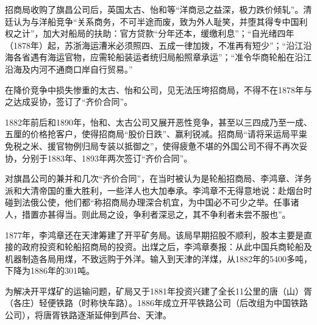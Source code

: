 \documentclass[10pt,a4paper]{beamer} %
\begin{document}
	\begin{frame}
		招商局收购了旗昌公司后，英国太古、怡和等“洋商忌之益深，极力跌价倾轧”。清廷认为与洋船竞争“关系商务，不可半途而废，致为外人耻笑，并堕其得专中国利权之计”，加大对船局的扶助：官方贷款“分年还本，缓缴利息”；“自光绪四年（1878年）起，苏浙海运漕米必须照四、五成一律加拨，不准再有短少”；“沿江沿海各省遇有海运官物，应需轮船装运者统归局船照章承运”；“准令华商轮船在沿江沿海及内河不通商口岸自行贸易。”
		
		在降价竞争中损失惨重的太古、怡和公司，见无法压垮招商局，不得不在1878年与之达成妥协，签订了“齐价合同”。
		
		1882年前后和1890年，怡和、太古公司又展开恶性竞争，甚至以三四成乃至一成、五厘的价格抢客户，使得招商局“股价日跌”、赢利锐减。招商局“请将采运局平粜免税之米、援官物例归局专装以抵御之”，使得疲惫不堪的外国公司不得不再次妥协，分别于1883年、1893年两次签订“齐价合同”。
		
		对旗昌公司的兼并和几次“齐价合同”，在当时被认为是轮船招商局、李鸿章、洋务派和大清帝国的重大胜利，一些洋人也大加奉承。李鸿章不无得意地说：赴烟台时碰到法俄公使，他们都“称招商局办理深合机宜，为中国必不可少之举。任事诸人，措置亦甚得当。则此局之设，争利者深忌之，其不争利者未尝不服也”。
		
		1877年，李鸿章还在天津筹建了开平矿务局。该局早期招股不顺利，股本主要是直接的政府投资和轮船招商局的投资。出煤之后，李鸿章奏报：从此中国兵商轮船及机器制造各局用煤，不致远购于外洋。输入到天津的洋煤，从1882年的5400多吨，下降为1886年的301吨。
		
		为解决开平煤矿的运输问题，矿局又于1881年投资兴建了全长11公里的唐（山）胥（各庄）轻便铁路（时称快车路）。1886年成立开平铁路公司（后改组为中国铁路公司），将唐胥铁路逐渐延伸到芦台、天津。
	\end{frame}
\end{document}
